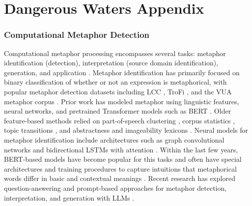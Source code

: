 \chapter{Dangerous Waters Appendix}
\label{chpt:appendix_03}

\subsection{Computational Metaphor Detection}
\label{app:computational}

Computational metaphor processing encompasses several tasks: metaphor identification (detection), interpretation (source domain identification), generation, and application \citep{shutova_models_2010,ge_survey_2023}. Metaphor identification has primarily focused on binary classification of whether or not an expression is metaphorical, with popular metaphor detection datasets including LCC \citep{mohler2016introducing}, TroFi \citep{birke2006clustering}, and the VUA metaphor corpus \citep{steen2010method}. Prior work has modeled metaphor using linguistic features, neural networks, and pretrained Transformer models such as BERT \citep{rai_survey_2020,kohli_cracking_2023}. Older feature-based methods relied on part-of-speech clustering \citep{shutova_metaphor_2010}, corpus statistics \citep{neuman_metaphor_2013}, topic transitions \citep{jang_metaphor_2016}, and abstractness and imageability lexicons \citep{tsvetkov_metaphor_2014}. Neural models for metaphor identification include architectures such as graph convolutional networks and bidirectional LSTMs with attention \citep{gao_neural_2018,mao_end--end_2019,dankers_being_2020,le_multi-task_2020}. Within the last few years, BERT-based models have become popular for this tasks and often have special architectures and training procedures to capture intuitions that metaphorical words differ in basic and contextual meanings \citep{liu_metaphor_2020,choi_melbert_2021,lin_cate_2021,aghazadeh_metaphors_2022,babieno_miss_2022,li_framebert_2023,li_finding_2024}. 
Recent research has explored question-answering and prompt-based approaches for metaphor detection, interpretation, and generation with LLMs \citep{dankin_can_2022,liu_testing_2022,joseph_newsmet_2023,lai_multilingual_2023,prystawski_psychologically-informed_2023,ichien_large_2024}. 

